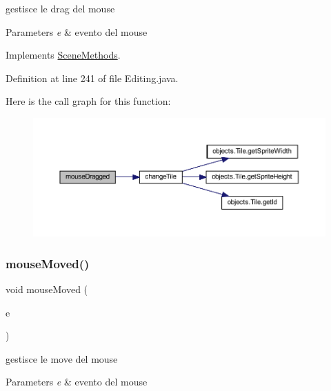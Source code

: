 gestisce le drag del mouse 


\begin{DoxyParams}{Parameters}
{\em e} & evento del mouse \\
\hline
\end{DoxyParams}


Implements \hyperlink{interfacescenes_1_1_scene_methods_adbfc0588c017133c9b7070474402b72f}{Scene\+Methods}.



Definition at line 241 of file Editing.\+java.

Here is the call graph for this function\+:\nopagebreak
\begin{figure}[H]
\begin{center}
\leavevmode
\includegraphics[width=350pt]{classscenes_1_1_editing_adbfc0588c017133c9b7070474402b72f_cgraph}
\end{center}
\end{figure}
\mbox{\label{classscenes_1_1_editing_a2ca251710b65639ec80bc141edde60aa}} 
\subsubsection{\texorpdfstring{mouse\+Moved()}{mouseMoved()}}
{\footnotesize\ttfamily void mouse\+Moved (\begin{DoxyParamCaption}\item[{Mouse\+Event}]{e }\end{DoxyParamCaption})}



gestisce le move del mouse 


\begin{DoxyParams}{Parameters}
{\em e} & evento del mouse \\
\hline
\end{DoxyParams}


